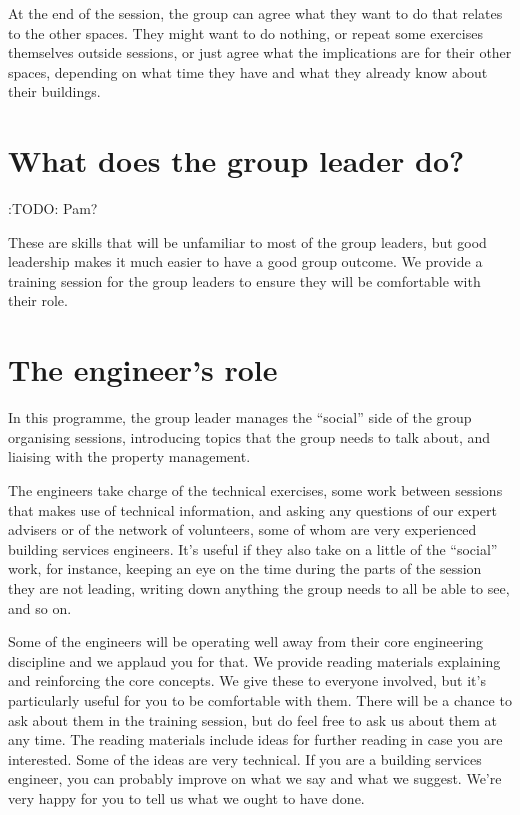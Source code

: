 \documentclass[letterpaper,10pt,english]{jupyterBook}
\begin{document}
\sphinxAtStartPar
At the end of the session, the group can agree what they want to do that relates to the other spaces.  They might want to do nothing, or repeat some exercises themselves outside sessions, or just agree what the implications are for their other spaces, depending on what time they have and what they already know about their buildings.

\sphinxstepscope


\chapter{What does the group leader do?}
\label{\detokenize{group-leadership:what-does-the-group-leader-do}}\label{\detokenize{group-leadership::doc}}
\sphinxAtStartPar
:TODO: Pam?

\sphinxAtStartPar
These are skills that will be unfamiliar to most of the group leaders, but good leadership makes it much easier to have a good group outcome.  We provide a training session for the group leaders to ensure they will be comfortable with their role.

\sphinxstepscope


\chapter{The engineer’s role}
\label{\detokenize{role-of-engineer:the-engineer-s-role}}\label{\detokenize{role-of-engineer::doc}}
\sphinxAtStartPar
In this programme, the group leader manages the “social” side of the group \sphinxhyphen{} organising sessions, introducing topics that the group needs to talk about, and liaising with the property management.

\sphinxAtStartPar
The engineers take charge of the technical exercises, some work between sessions that makes use of technical information, and asking any questions of our expert advisers or of the network of volunteers, some of whom are very experienced building services engineers. It’s useful if they also take on a little of the “social” work, for instance, keeping an eye on the time during the parts of the session they are not leading, writing down anything the group needs to all be able to see, and so on.



\sphinxAtStartPar
Some of the engineers will be operating well away from their core engineering discipline \sphinxhyphen{} and we applaud you for that.  We provide reading materials explaining and reinforcing the core concepts.  We give these to everyone involved, but it’s particularly useful for you to be comfortable with them.  There will be a chance to ask about them in the training session, but do feel free to ask us about them at any time.  The reading materials include ideas for further reading in case you are interested.  Some of the ideas are very technical.  If you are a building services engineer, you can probably improve on what we say and what we suggest.  We’re very happy for you to tell us what we ought to have done.
\end{document}
